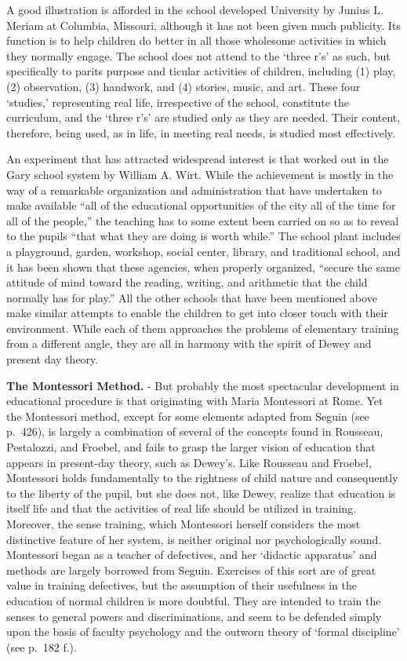 \documentclass[
]{book}
\begin{document}
A good illustration is afforded in the school developed University by Junius L. Meriam at Columbia, Missouri, although it has not been given much publicity. Its function is to help children do better in all those wholesome activities in which they normally engage. The school does not attend to the `three r's' as such, but specifically to parits purpose and ticular activities of children, including (1) play, (2) observation, (3) handwork, and (4) stories, music, and art. These four `studies,' representing real life, irrespective of the school, constitute the curriculum, and the `three r's' are studied only as they are needed. Their content, therefore, being used, as in life, in meeting real needs, is studied most effectively.

An experiment that has attracted widespread interest is that worked out in the Gary school system by William A. Wirt. While the achievement is mostly in the way of a remarkable organization and administration that have undertaken to make available ``all of the educational opportunities of the city all of the time for all of the people,'' the teaching has to some extent been carried on so as to reveal to the pupils ``that what they are doing is worth while.'' The school plant includes a playground, garden, workshop, social center, library, and traditional school, and it has been shown that these agencies, when properly organized, ``secure the same attitude of mind toward the reading, writing, and arithmetic that the child normally has for play.'' All the other schools that have been mentioned above make similar attempts to enable the children to get into closer touch with their environment. While each of them approaches the problems of elementary training from a different angle, they are all in harmony with the spirit of Dewey and present day theory.

\textbf{The Montessori Method.} - But probably the most spectacular development in educational procedure is that originating with Maria Montessori at Rome. Yet the Montessori method, except for some elements adapted from Seguin (see p.~426), is largely a combination of several of the concepts found in Rousseau, Pestalozzi, and Froebel, and fails to grasp the larger vision of education that appears in present-day theory, such as Dewey's. Like Rousseau and Froebel, Montessori holds fundamentally to the rightness of child nature and consequently to the liberty of the pupil, but she does not, like Dewey, realize that education is itself life and that the activities of real life should be utilized in training. Moreover, the sense training, which Montessori herself considers the most distinctive feature of her system, is neither original nor psychologically sound. Montessori began as a teacher of defectives, and her `didactic apparatus' and methods are largely borrowed from Seguin. Exercises of this sort are of great value in training defectives, but the assumption of their usefulness in the education of normal children is more doubtful. They are intended to train the senses to general powers and discriminations, and seem to be defended simply upon the basis of faculty psychology and the outworn theory of `formal discipline' (see p.~182 f.).
\end{document}
